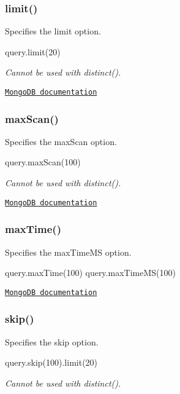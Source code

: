 \subsubsection*{limit()}

Specifies the limit option.


\begin{DoxyCode}
query.limit(20)
\end{DoxyCode}


{\itshape Cannot be used with {\ttfamily distinct()}.}

\href{http://docs.mongodb.org/manual/reference/method/cursor.limit/}{\tt Mongo\+DB documentation}

\subsubsection*{max\+Scan()}

Specifies the max\+Scan option.


\begin{DoxyCode}
query.maxScan(100)
\end{DoxyCode}


{\itshape Cannot be used with {\ttfamily distinct()}.}

\href{http://docs.mongodb.org/manual/reference/operator/maxScan/}{\tt Mongo\+DB documentation}

\subsubsection*{max\+Time()}

Specifies the max\+Time\+MS option.


\begin{DoxyCode}
query.maxTime(100)
query.maxTimeMS(100)
\end{DoxyCode}


\href{http://docs.mongodb.org/manual/reference/method/cursor.maxTimeMS/}{\tt Mongo\+DB documentation}

\subsubsection*{skip()}

Specifies the skip option.


\begin{DoxyCode}
query.skip(100).limit(20)
\end{DoxyCode}


{\itshape Cannot be used with {\ttfamily distinct()}.}

